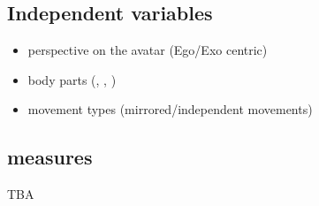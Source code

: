 \subsection{Independent variables}
\begin{itemize}
	\item perspective on the avatar (Ego/Exo centric)
	\item body parts (\UB, \LB, \FB)
	\item movement types (mirrored/independent movements)
\end{itemize}

\subsection{measures}
TBA